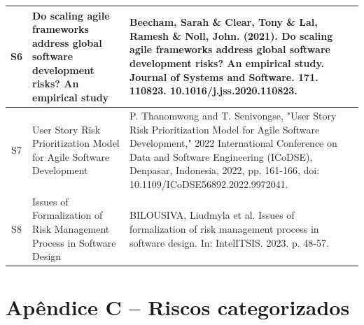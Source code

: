 \documentclass[
	12pt,
	openright,
	twoside,
	a4paper,
	english,
	brazil
	]{abntex2}
\begin{document}
\begin{longtable}{|c|p{5.5cm}|p{7.5cm}|}
  \hline
  S6 & Do scaling agile frameworks address global software development risks? An empirical study & Beecham, Sarah \& Clear, Tony \& Lal, Ramesh \& Noll, John. (2021). Do scaling agile frameworks address global software development risks? An empirical study. Journal of Systems and Software. 171. 110823. 10.1016/j.jss.2020.110823. \\
  \hline
  S7 & User Story Risk Prioritization Model for Agile Software Development & P. Thanomwong and T. Senivongse, "User Story Risk Prioritization Model for Agile Software Development," 2022 International Conference on Data and Software Engineering (ICoDSE), Denpasar, Indonesia, 2022, pp. 161-166, doi: 10.1109/ICoDSE56892.2022.9972041. \\
  \hline
  S8 & Issues of Formalization of Risk Management Process in Software Design & BILOUSIVA, Liudmyla et al. Issues of formalization of risk management process in software design. In: IntelITSIS. 2023. p. 48-57. \\
  \hline
\end{longtable}

\chapter*{Apêndice C – Riscos categorizados}

\vspace{-2em}  %

\end{document}
